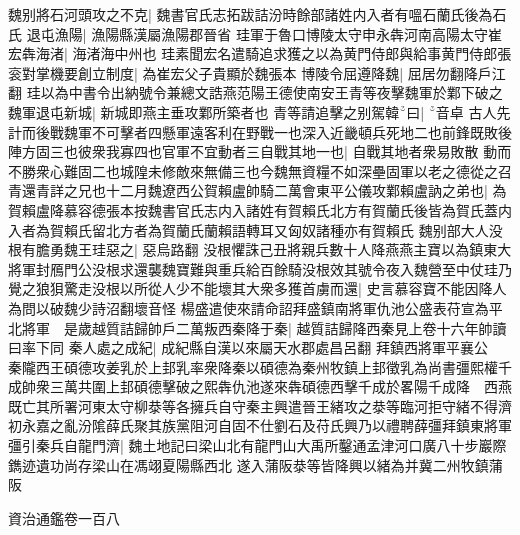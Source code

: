 魏别將石河頭攻之不克|{
	魏書官氏志拓跋詰汾時餘部諸姓内入者有嗢石蘭氏後為石氏}
退屯漁陽|{
	漁陽縣漢屬漁陽郡晉省}
珪軍于魯口博陵太守申永犇河南高陽太守崔宏犇海渚|{
	海渚海中州也}
珪素聞宏名遣騎追求獲之以為黄門侍郎與給事黄門侍郎張衮對掌機要創立制度|{
	為崔宏父子貴顯於魏張本}
博陵令屈遵降魏|{
	屈居勿翻降戶江翻}
珪以為中書令出納號令兼總文誥燕范陽王德使南安王青等夜擊魏軍於鄴下破之魏軍退屯新城|{
	新城即燕主垂攻鄴所築者也}
青等請追擊之别駕韓曰|{
	音卓}
古人先計而後戰魏軍不可擊者四懸軍遠客利在野戰一也深入近畿頓兵死地二也前鋒既敗後陣方固三也彼衆我寡四也官軍不宜動者三自戰其地一也|{
	自戰其地者衆易敗散}
動而不勝衆心難固二也城隍未修敵來無備三也今魏無資糧不如深壘固軍以老之德從之召青還青詳之兄也十二月魏遼西公賀賴盧帥騎二萬會東平公儀攻鄴賴盧訥之弟也|{
	為賀賴盧降慕容德張本按魏書官氏志内入諸姓有賀賴氏北方有賀蘭氏後皆為賀氏蓋内入者為賀賴氏留北方者為賀蘭氏蘭賴語轉耳又匈奴諸種亦有賀賴氏}
魏别部大人没根有膽勇魏王珪惡之|{
	惡烏路翻}
没根懼誅己丑將親兵數十人降燕燕主寶以為鎮東大將軍封鴈門公没根求還襲魏寶難與重兵給百餘騎没根效其號令夜入魏營至中仗珪乃覺之狼狽驚走没根以所從人少不能壞其大衆多獲首虜而還|{
	史言慕容寶不能因降人為問以破魏少詩沼翻壞音怪}
楊盛遣使來請命詔拜盛鎮南將軍仇池公盛表苻宣為平北將軍　是歲越質詰歸帥戶二萬叛西秦降于秦|{
	越質詰歸降西秦見上卷十六年帥讀曰率下同}
秦人處之成紀|{
	成紀縣自漢以來屬天水郡處昌呂翻}
拜鎮西將軍平襄公　秦隴西王碩德攻姜乳於上邽乳率衆降秦以碩德為秦州牧鎮上邽徵乳為尚書彊熙權千成帥衆三萬共圍上邽碩德擊破之熙犇仇池遂來犇碩德西擊千成於畧陽千成降　西燕既亡其所署河東太守柳㳟等各擁兵自守秦主興遣晉王緒攻之㳟等臨河拒守緒不得濟初永嘉之亂汾隂薛氏聚其族黨阻河自固不仕劉石及苻氏興乃以禮聘薛彊拜鎮東將軍彊引秦兵自龍門濟|{
	魏土地記曰梁山北有龍門山大禹所鑿通孟津河口廣八十步巖際鐫迹遺功尚存梁山在馮翊夏陽縣西北}
遂入蒲阪㳟等皆降興以緒為并冀二州牧鎮蒲阪

資治通鑑卷一百八
